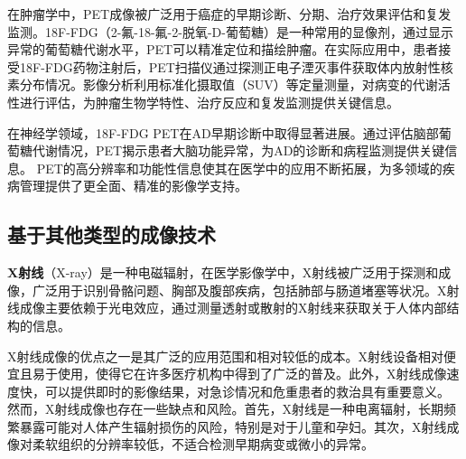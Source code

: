 在肿瘤学中，PET成像被广泛用于癌症的早期诊断、分期、治疗效果评估和复发监测。18F-FDG（2-氟-18-氟-2-脱氧-D-葡萄糖）是一种常用的显像剂，通过显示异常的葡萄糖代谢水平，PET可以精准定位和描绘肿瘤。在实际应用中，患者接受18F-FDG药物注射后，PET扫描仪通过探测正电子湮灭事件获取体内放射性核素分布情况。影像分析利用标准化摄取值（SUV）等定量测量，对病变的代谢活性进行评估，为肿瘤生物学特性、治疗反应和复发监测提供关键信息。


在神经学领域，18F-FDG PET在AD早期诊断中取得显著进展。通过评估脑部葡萄糖代谢情况，PET揭示患者大脑功能异常，为AD的诊断和病程监测提供关键信息。 PET的高分辨率和功能性信息使其在医学中的应用不断拓展，为多领域的疾病管理提供了更全面、精准的影像学支持。

\subsection{基于其他类型的成像技术}
\textbf{X射线}（X-ray）\cite{warren1990x}是一种电磁辐射，在医学影像学中，X射线被广泛用于探测和成像，广泛用于识别骨骼问题、胸部及腹部疾病，包括肺部与肠道堵塞等状况。X射线成像主要依赖于光电效应，通过测量透射或散射的X射线来获取关于人体内部结构的信息。

X射线成像的优点之一是其广泛的应用范围和相对较低的成本。X射线设备相对便宜且易于使用，使得它在许多医疗机构中得到了广泛的普及。此外，X射线成像速度快，可以提供即时的影像结果，对急诊情况和危重患者的救治具有重要意义。
然而，X射线成像也存在一些缺点和风险。首先，X射线是一种电离辐射，长期频繁暴露可能对人体产生辐射损伤的风险，特别是对于儿童和孕妇。其次，X射线成像对柔软组织的分辨率较低，不适合检测早期病变或微小的异常。


